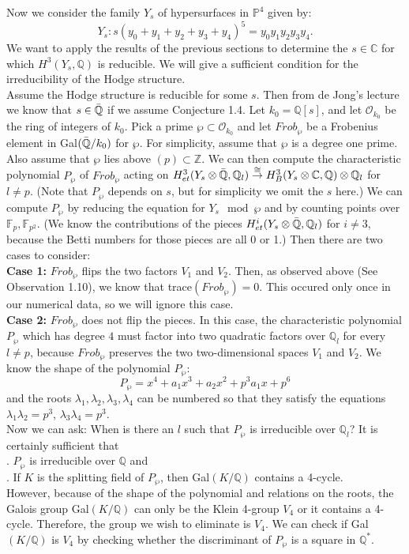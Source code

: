 \documentclass[12pt,titlepage]{article}
\newcommand{\Pl}{{\mathbb P}}
\begin{document}
Now we consider the family $Y_s$ of hypersurfaces in $\Pl^4$ given
by:
$$Y_s: s(y_0+y_1+y_2+y_3+y_4)^5 = y_0y_1y_2y_3y_4.$$ We want to apply
 the results of the previous sections to determine the $s \in
 \mathbb{C}$ for which  $H^3(Y_{s},\mathbb{Q})$ is reducible. We will give a
 sufficient condition for the irreducibility of the Hodge
 structure. \\ Assume the Hodge structure is reducible for some $s$.
 Then from de Jong's lecture we know that $s\in \Bar{\mathbb{Q}}$ if
 we assume Conjecture 1.4.  Let $k_0 = \mathbb{Q}[s]$, and let
 $\mathcal{O}_{k_0}$ be the ring of integers of $k_0$. Pick a prime
 $\wp \subset \mathcal{O}_{k_0}$ and let $Frob_{\wp}$ be a Frobenius
 element in Gal$(\Bar{\mathbb{Q}}/k_0)$ for $\wp$. For simplicity,
 assume that $\wp$ is a degree one prime. Also assume that $\wp$ lies
 above $(p) \subset \mathbb{Z}$. We can then compute the characteristic
 polynomial $P_{\wp}$ of $Frob_{\wp}$ acting on $H^3_{et}(Y_{s}
 \otimes \Bar{\mathbb{Q}}, \mathbb{Q}_{l})
 \overset{\cong}{\rightarrow} H^3_{B}(Y_{s} \otimes \mathbb{C},
 \mathbb{Q})\otimes \mathbb{Q}_{l}$ for $l \neq p$. (Note that
 $P_{\wp}$ depends on $s$, but for simplicity we omit the $s$ here.)
 We can compute $P_{\wp}$ by reducing the equation for $Y_s \mod \wp$ and
 by counting points over $\mathbb{F}_p, \mathbb{F}_{p^2}$. (We know the
 contributions of the pieces $H^i_{et}(Y_s\otimes \Bar{\mathbb{Q}},
 \mathbb{Q}_{l})$ for $i \neq 3$, because the Betti numbers for those
 pieces are all 0 or 1.)  Then there are two cases to consider:\\
 \textbf{Case 1:} $Frob_{\wp}$ flips the two factors $V_1$ and $V_2$.
 Then, as observed above (See Observation 1.10), we know that
 trace$(Frob_{\wp}) = 0$. This occured only once in our numerical
 data, so we will ignore this case.\\ \textbf{Case 2:} $Frob_{\wp}$
 does not flip the pieces.  In this case, the characteristic
 polynomial $P_{\wp}$ which has degree $4$ must factor into two
 quadratic factors over $\mathbb{Q}_{l}$ for every $l\neq p$, because
 $Frob_{\wp}$ preserves the two two-dimensional spaces $V_1$ and
 $V_2$. We know the shape of the polynomial $P_{\wp}$:
  \[P_{\wp} = x^4 + a_1 x^3 + a_2 x^2 + p^3 a_1 x + p^6 \]
  and the roots $\lambda_1, \lambda_2, \lambda_3, \lambda_4$ can be
  numbered so that they satisfy the equations $\lambda_1 \lambda_2 =
  p^3$, $\lambda_3 \lambda_4 = p^3$. \\ Now we can ask: When is there
  an $l$ such that $P_{\wp}$ is irreducible over $\mathbb{Q}_{l}$? It
  is certainly sufficient that \\ . $P_{\wp}$ is irreducible
  over $\mathbb{Q}$ and \\ . If $K$ is the splitting field of
  $P_{\wp}$, then Gal$(K/\mathbb{Q})$ contains a 4-cycle.\\ However,
  because of the shape of the polynomial and relations on the roots,
  the Galois group Gal$(K/\mathbb{Q})$ can only be the Klein 4-group
  $V_4$ or it contains a 4-cycle.  Therefore, the group we wish to
  eliminate is $V_4$.  We can check if Gal$(K/\mathbb{Q})$ is $V_4$ by
  checking whether the discriminant of $P_{\wp}$ is a square in $\mathbb{Q}^*$.
\end{document}
